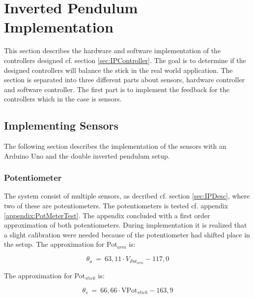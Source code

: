 \chapter{Inverted Pendulum Implementation}\label{sec:InvPendImp}
This section describes the hardware and software implementation of the controllers designed cf. section \ref{sec:IPController}. The goal is to determine if the designed controllers will balance the stick in the real world application. The section is separated into three different parts about sensors, hardware controller and software controller. The first part is to implement the feedback for the controllers which in the case is sensors. 

\section{Implementing Sensors}
The following section describes the implementation of the sensors with an Arduino Uno and the double inverted pendulum setup.   

\subsection*{Potentiometer}\label{section:PotmeterImplementation}
The system consist of multiple sensors, as decribed cf. section \ref{sec:IPDesc}, where two of these are potentiometers. The potentiometers is tested cf. appendix \ref{appendix:PotMeterTest}. The appendix concluded with a first order approximation of both potentiometers. During implementation it is realized that a slight calibration were needed because of the potentiometer had shifted place in the setup. The approximation for Pot$_{arm}$ is:

\begin{equation}
\theta_a\ =\ 63,11 \cdot V_{{Pot}_{arm}} - 117,0
\end{equation}
\startexplain
\stopexplain

The approximation for Pot$_{stick}$ is:

\begin{equation}
\theta_s\ =\ 66,66 \cdot \text{VPot}_{stick} - 163,9
\end{equation}

\startexplain
\stopexplain

